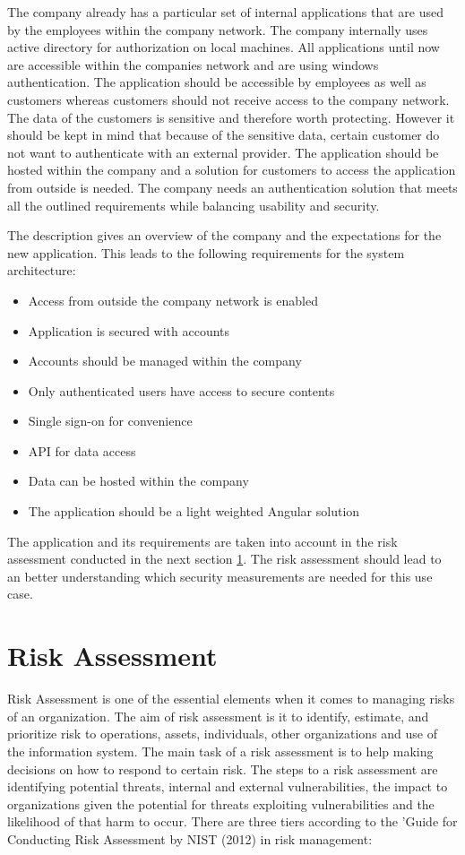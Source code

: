 The company already has a particular set of internal applications that are used by the employees within the company network. The company internally uses active directory for authorization on local machines. All applications until now are accessible within the companies network and are using windows authentication. The application should be accessible by employees as well as customers whereas customers should not receive access to the company network. The data of the customers is sensitive and therefore worth protecting. However it should be kept in mind that because of the sensitive data, certain customer do not want to authenticate with an external provider. The application should be hosted within the company and a solution for customers to access the application from outside is needed. The company needs an authentication solution that meets all the outlined requirements while balancing usability and security. 

The description gives an overview of the company and the expectations for the new application. This leads to the following requirements for the system architecture:

\begin{itemize}
	\item Access from outside the company network is enabled
	\item Application is secured with accounts
	\item Accounts should be managed within the company
	\item Only authenticated users have access to secure contents
	\item Single sign-on for convenience
	\item API for data access
	\item Data can be hosted within the company
	\item The application should be a light weighted Angular solution
\end{itemize} 

The application and its requirements are taken into account in the risk assessment conducted in the next section \ref{riskassessment}. The risk assessment should lead to an better understanding which security measurements are needed for this use case. 

\section{Risk Assessment}
\label{riskassessment}
Risk Assessment is one of the essential elements when it comes to managing risks of an organization. The aim of risk assessment is it to identify, estimate, and prioritize risk to operations, assets, individuals, other organizations and use of the information system. The main task of a risk assessment is to help making decisions on how to respond to certain risk. The steps to a risk assessment are identifying potential threats, internal and external vulnerabilities, the impact to organizations given the potential for threats exploiting vulnerabilities and the likelihood of that harm to occur. There are three tiers according to the 'Guide for Conducting Risk Assessment by NIST (2012) in risk management:

